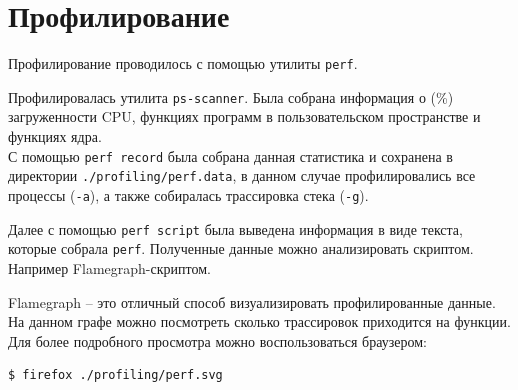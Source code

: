 \section{Профилирование}

Профилирование проводилось с помощью утилиты \verb|perf|.

\linespace

Профилировалась утилита \verb|ps-scanner|. Была собрана информация о (\%) загруженности CPU, функциях программ в пользовательском пространстве и функциях ядра.\\
С помощью \verb|perf record| была собрана данная статистика и сохранена в директории \verb|./profiling/perf.data|, в данном случае профилировались все процессы (\verb|-a|), а также собиралась трассировка стека (\verb|-g|).

\linespace

Далее с помощью \verb|perf script| была выведена информация в виде текста, которые собрала \verb|perf|. Полученные данные можно анализировать скриптом. Например Flamegraph-скриптом.

\linespace

Flamegraph -- это отличный способ визуализировать профилированные данные. На данном графе можно посмотреть сколько трассировок приходится на функции. Для более подробного просмотра можно воспользоваться браузером:
\begin{lstlisting}[language=bash]
$ firefox ./profiling/perf.svg
\end{lstlisting}

\newpage

